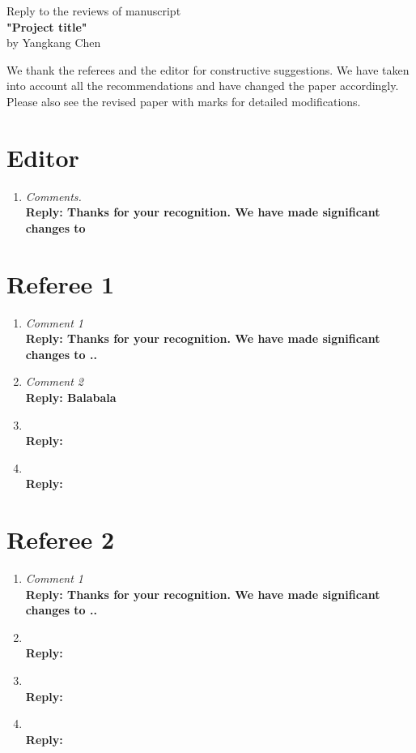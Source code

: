 \begin{center}
Reply to the reviews  of manuscript \\
\textbf{"Project title"} \\
by Yangkang Chen
\end{center}

We thank the referees and the editor for constructive suggestions. We have taken into account all the recommendations and have changed the paper accordingly. Please also see the revised paper with marks for detailed modifications.

\section{Editor}
\begin{enumerate}
\item
\emph{Comments.}\\
\textbf{Reply: Thanks for your recognition.  We have made significant changes to }
\end{enumerate}


\section{Referee 1}
\begin{enumerate}
\item \emph{  Comment 1} \\
\textbf{Reply: Thanks for your recognition. We have made significant changes to ..}

\item \emph{  Comment 2} \\
\textbf{Reply: Balabala}

\item \emph{  } \\
\textbf{Reply:}

\item \emph{ } \\
\textbf{Reply: }

\end{enumerate}

\section{Referee 2}
\begin{enumerate}
\item \emph{  Comment 1} \\
\textbf{Reply: Thanks for your recognition. We have made significant changes to ..}

\item \emph{  } \\
\textbf{Reply: }

\item \emph{  } \\
\textbf{Reply:}

\item \emph{ } \\
\textbf{Reply: }

\end{enumerate}

